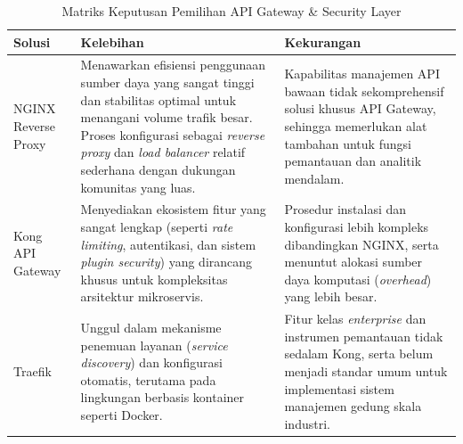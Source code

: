 \begin{table}[htbp]
    \centering
    \caption{Matriks Keputusan Pemilihan API Gateway \& Security Layer}
    \label{tab:matriks_api_gateway}
    \begin{tabularx}{\textwidth}{|l|X|X|}
        \hline
        \textbf{Solusi} & \textbf{Kelebihan} & \textbf{Kekurangan} \\
        \hline
        NGINX Reverse Proxy & Menawarkan efisiensi penggunaan sumber daya yang sangat tinggi dan stabilitas optimal untuk menangani volume trafik besar. Proses konfigurasi sebagai \textit{reverse proxy} dan \textit{load balancer} relatif sederhana dengan dukungan komunitas yang luas. & Kapabilitas manajemen API bawaan tidak sekomprehensif solusi khusus API Gateway, sehingga memerlukan alat tambahan untuk fungsi pemantauan dan analitik mendalam. \\
        \hline
        Kong API Gateway & Menyediakan ekosistem fitur yang sangat lengkap (seperti \textit{rate limiting}, autentikasi, dan sistem \textit{plugin security}) yang dirancang khusus untuk kompleksitas arsitektur mikroservis. & Prosedur instalasi dan konfigurasi lebih kompleks dibandingkan NGINX, serta menuntut alokasi sumber daya komputasi (\textit{overhead}) yang lebih besar. \\
        \hline
        Traefik & Unggul dalam mekanisme penemuan layanan (\textit{service discovery}) dan konfigurasi otomatis, terutama pada lingkungan berbasis kontainer seperti Docker. & Fitur kelas \textit{enterprise} dan instrumen pemantauan tidak sedalam Kong, serta belum menjadi standar umum untuk implementasi sistem manajemen gedung skala industri. \\
        \hline
    \end{tabularx}
\end{table}